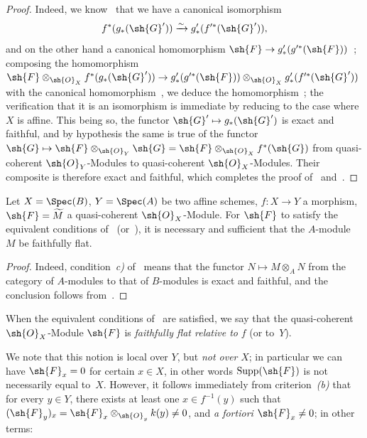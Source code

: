 \begin{proof}
Indeed, we know~ that we have a canonical isomorphism
\[
  f^*(g_*(\sh{G}'))\xrightarrow{\sim} g'_*(f'^*(\sh{G}')),
\]
and on the other hand a canonical homomorphism $\sh{F}\to g'_*(g'^*(\sh{F}))$~; composing the homomorphism $\sh{F}\otimes_{\sh{O}_X}f^*(g_*(\sh{G}'))\to g'_*(g'^*(\sh{F}))\otimes_{\sh{O}_X}g'_*(f'^*(\sh{G}'))$ with the canonical homomorphism~, we deduce the homomorphism~; the verification that it is an isomorphism is immediate by reducing to the case where $X$ is affine.
This being so, the functor $\sh{G}'\mapsto g_*(\sh{G}')$ is exact and faithful, and by hypothesis the same is true of the functor $\sh{G}\mapsto\sh{F}\otimes_{\sh{O}_Y}\sh{G}=\sh{F}\otimes_{\sh{O}_X}f^*(\sh{G})$ from quasi-coherent $\sh{O}_Y$-Modules to quasi-coherent $\sh{O}_X$-Modules.
Their composite is therefore exact and faithful, which completes the proof of~ and~.
\end{proof}

\begin{corollary}[2.2.3]
\label{IV.2.2.3}
Let $X=\Spec(B)$, $Y=\Spec(A)$ be two affine schemes, $f:X\to Y$ a morphism, $\sh{F}=\widetilde{M}$ a quasi-coherent $\sh{O}_X$-Module.
For $\sh{F}$ to satisfy the equivalent conditions of~ \textnormal{(}or~\textnormal{)}, it is necessary and sufficient that the $A$-module $M$ be faithfully flat.
\end{corollary}

\begin{proof}
Indeed, condition~\emph{c)} of~ means that the functor $N\mapsto M\otimes_A N$ from the category of $A$-modules to that of $B$-modules is exact and faithful, and the conclusion follows from~.
\end{proof}

\begin{definition}[2.2.4]
\label{IV.2.2.4}
When the equivalent conditions of~ are satisfied, we say that the quasi-coherent $\sh{O}_X$-Module $\sh{F}$ is \emph{faithfully flat relative to} $f$ (or to~$Y$).
\end{definition}

We note that this notion is local over $Y$, but \emph{not over} $X$; in particular we can have $\sh{F}_x=0$ for certain $x\in X$, in other words $\operatorname{Supp}(\sh{F})$ is not necessarily equal to~$X$.
However, it follows immediately from criterion~\emph{(b)} that for every $y\in Y$, there exists at least one $x\in f^{-1}(y)$ such that $(\sh{F}_y)_x=\sh{F}_x\otimes_{\sh{O}_y}k(y)\neq 0$, and \emph{a fortiori} $\sh{F}_x\neq 0$; in other terms:

